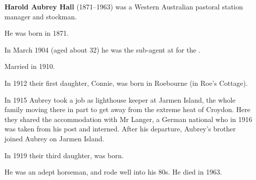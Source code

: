 
\textbf{Harold Aubrey Hall} (1871--1963) was a Western Australian pastoral station manager and stockman.

He was born in 1871.\cite{ADBWSHall}

In March 1904 (aged about 32) he was the sub-agent at  for the .\cite{1904AubreyAgent}

Married  in 1910.\cite{HAHmarriage}

In 1912 their first daughter, Connie, was born in Roebourne (in Roe's Cottage).\cite{Connie1966}

In 1915 Aubrey took a job as lighthouse keeper at Jarmen Island,
the whole family moving there in part to get away from the extreme heat of Croydon.\cite{Connie1983}
Here they shared the accommodation with Mr Langer,
a German national who in 1916 was taken from his post and interned.\cite{Connie1983}
After his departure, Aubrey's brother  joined Aubrey on Jarmen Island.

In 1919 their third daughter,  was born.

He was an adept horseman, and rode well into his 80s. He died in 1963.
